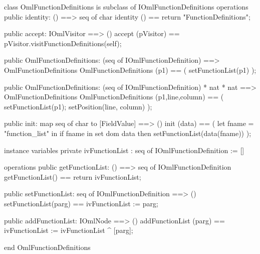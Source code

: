 \begin{vdm_al}
class OmlFunctionDefinitions is subclass of IOmlFunctionDefinitions
operations
  public identity: () ==> seq of char
  identity () == return "FunctionDefinitions";

  public accept: IOmlVisitor ==> ()
  accept (pVisitor) == pVisitor.visitFunctionDefinitions(self);

  public OmlFunctionDefinitions:
    (seq of IOmlFunctionDefinition) ==> OmlFunctionDefinitions
  OmlFunctionDefinitions (p1) == 
    ( setFunctionList(p1) );

  public OmlFunctionDefinitions:
    (seq of IOmlFunctionDefinition) *
    nat *
    nat ==> OmlFunctionDefinitions
  OmlFunctionDefinitions (p1,line,column) == 
    ( setFunctionList(p1);
      setPosition(line, column) );

  public init: map seq of char to [FieldValue] ==> ()
  init (data) ==
    ( let fname = "function_list" in
        if fname in set dom data
        then setFunctionList(data(fname)) );

instance variables
  private ivFunctionList : seq of IOmlFunctionDefinition := []

operations
  public getFunctionList: () ==> seq of IOmlFunctionDefinition
  getFunctionList() == return ivFunctionList;

  public setFunctionList: seq of IOmlFunctionDefinition ==> ()
  setFunctionList(parg) == ivFunctionList := parg;

  public addFunctionList: IOmlNode ==> ()
  addFunctionList (parg) == ivFunctionList := ivFunctionList ^ [parg];

end OmlFunctionDefinitions
\end{vdm_al}

